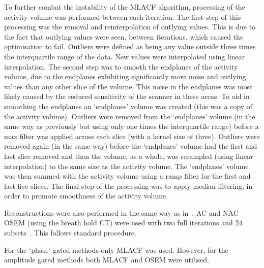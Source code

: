                 To further combat the instability of the \gls{MLACF} algorithm, processing of the activity volume was performed between each iteration. The first step of this processing was the removal and reinterpolation of outlying values. This is due to the fact that outlying values were seen, between iterations, which caused the optimisation to fail. Outliers were defined as being any value outside three times the interquartile range of the data. New values were interpolated using linear interpolation. The second step was to smooth the endplanes of the activity volume, due to the endplanes exhibiting significantly more noise and outlying values than any other slice of the volume. This noise in the endplanes was most likely caused by the reduced sensitivity of the scanner in these areas. To aid in smoothing the endplanes an `endplanes' volume was created (this was a copy of the activity volume). Outliers were removed from the `endplanes' volume (in the same way as previously but using only one times the interquartile range) before a max filter was applied across each slice (with a kernel size of three). Outliers were removed again (in the same way) before the `endplanes' volume had the first and last slice removed and then the volume, as a whole, was resampled (using linear interpolation) to the same size as the activity volume. The `endplanes' volume was then summed with the activity volume using a ramp filter for the first and last five slices. The final step of the processing was to apply median filtering, in order to promote smoothness of the activity volume.

                Reconstructions were also performed in the same way as in~. \gls{AC} and \gls{NAC} \gls{OSEM} (using the breath hold \gls{CT}) were used with two full iterations and $24$ subsets~\parencite{Hudson1994}. This follows standard procedure.
                
                For the `phase' gated methods only \gls{MLACF} was used. However, for the amplitude gated methods both \gls{MLACF} and \gls{OSEM} were utilised.
            
